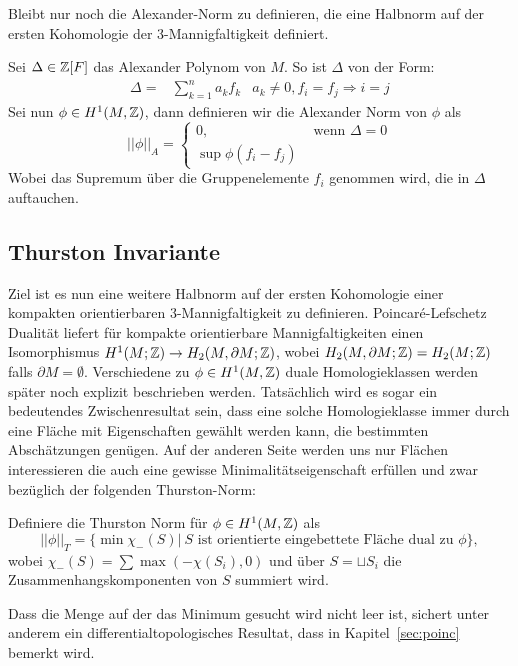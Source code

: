     	Bleibt nur noch die Alexander-Norm zu definieren, die eine Halbnorm auf der ersten Kohomologie der 3-Mannigfaltigkeit definiert.
    	\begin{defn}
    		Sei  $\Delta \in \mathbb{Z} [F]$ das Alexander Polynom von $M$. So ist $\Delta$ von der Form:
    		\begin{align*}
    		    			\Delta = &\sum_{k=1}^n a_k f_k& a_k \neq 0, f_i = f_j \Rightarrow i=j
    		\end{align*}
    		Sei nun $\phi \in H^1 (M,\mathbb{Z})$, dann definieren wir die Alexander Norm von $\phi$ als
    		\[
    			||\phi||_A = \begin{cases}
    				0 , &\text{ wenn } \Delta=0\\
    				\sup \phi (f_i - f_j) &
    			\end{cases}
    		\]
    		Wobei das Supremum über die Gruppenelemente $f_i$ genommen wird, die in $\Delta$ auftauchen.

    	\end{defn}

    \subsection{Thurston Invariante}

        Ziel ist es nun eine weitere Halbnorm auf der ersten Kohomologie einer kompakten orientierbaren 3-Mannigfaltigkeit zu definieren. Poincaré-Lefschetz Dualität liefert für kompakte orientierbare Mannigfaltigkeiten einen Isomorphismus $H^1(M;\mathbb{Z}) \to H_2(M,\partial M;\mathbb{Z})$, wobei $H_2(M,\partial M;\mathbb{Z})=H_2(M;\mathbb{Z})$ falls $\partial M=\emptyset$. Verschiedene zu $\phi \in H^1(M,\mathbb{Z})$ duale Homologieklassen werden später noch explizit beschrieben werden. Tatsächlich wird es sogar ein bedeutendes Zwischenresultat sein, dass eine solche Homologieklasse immer durch eine Fläche mit Eigenschaften gewählt werden kann, die bestimmten Abschätzungen genügen. Auf der anderen Seite werden uns nur Flächen interessieren die auch eine gewisse Minimalitätseigenschaft erfüllen und zwar bezüglich der folgenden Thurston-Norm:
        \begin{defn}
        	Definiere die Thurston Norm für $\phi \in H^1(M,\mathbb{Z})$ als
        	\[
        	        		||\phi||_T = \{\min \chi_-(S)| ~S\text{ ist orientierte eingebettete Fläche dual zu } \phi \},
        	        	\]        	
        	wobei $\chi_-(S)=\sum \max (-\chi(S_i),0)$ und über $S=\sqcup S_i$ die Zusammenhangskomponenten von $S$ summiert wird.
        \end{defn}
        Dass die Menge auf der das Minimum gesucht wird nicht leer ist, sichert unter anderem ein differentialtopologisches Resultat, dass in Kapitel~\ref{sec:poinc} bemerkt wird.

